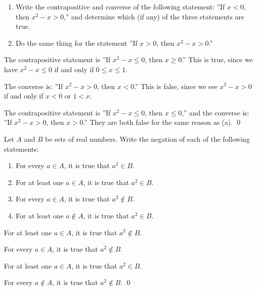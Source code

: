 \documentclass[a4paper,12pt]{article}
\begin{document}
\begin{exe}\leavevmode \par
	\begin{enumerate}
		\item
		      Write the contrapositive and converse of the following statement:
		      ''If \( x<0 \), then \( x^2 - x >0 \),''
		      and determine which (if any) of the three statements are true.
		      
		\item
		      Do the same thing for the statement ''If \( x>0 \), then \( x^2 - x >0 \).''
	\end{enumerate}
\end{exe}\begin{sol}\leavevmode \par
	The contrapositive statement is
	''If \( x^2-x \le 0 \), then \( x \ge 0 \).''
	This is true, since we have \( x^2-x \le 0 \) if and only if \( 0 \le x \le 1 \).
	
	The converse is:
	''If \( x^2-x > 0 \), then \( x < 0 \).''
	This is false, since we see \( x^2-x > 0 \)
	if and only if \( x<0 \) or \( 1<x \).
	
	The contrapositive statement is
	''If \( x^2-x \le 0 \), then \( x \le 0 \),''
	and the converse is:
	''If \( x^2-x > 0 \), then \( x > 0 \).''
	They are both false for the same reason as (a).
	\qed\end{sol}

\begin{exe}
	Let \( A \) and \( B \) be sets of real numbers.
	Write the negation of each of the following statements:
	\begin{enumerate}
		\item
		      For every \( a \in A \), it is true that \( a^2 \in B \).
		      
		\item
		      For at least one \( a \in A \), it is true that \( a^2 \in B \).
		      
		\item
		      For every \( a \in A \), it is true that \( a^2 \notin B \).
		      
		\item
		      For at least one \( a \notin A \), it is true that \( a^2 \in B \).
	\end{enumerate}
\end{exe}\begin{sol}\leavevmode \par
	For at least one \( a \in A \), it is true that \( a^2 \notin B \).
	
	For every \( a \in A \), it is true that \( a^2 \notin B \).
	
	For at least one \( a \in A \), it is true that \( a^2 \in B \).
	
	For every \( a \notin A \), it is true that \( a^2 \notin B \).
	\qed\end{sol}
\end{document}
